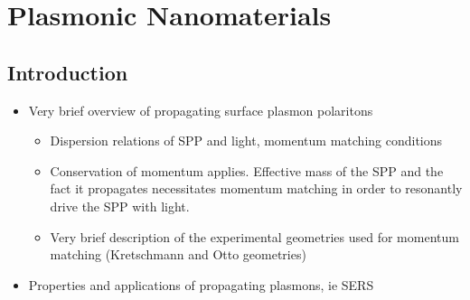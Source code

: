 \chapter{Plasmonic Nanomaterials}\label{sec:background:Plasmonics}

\section{Introduction}
\begin{itemize}
    \item Very brief overview of propagating surface plasmon polaritons
    \begin{itemize}
        \item Dispersion relations of SPP and light, momentum matching conditions
        \item Conservation of momentum applies. Effective mass of the SPP and the fact it propagates necessitates momentum matching in order to resonantly drive the SPP with light.
        \item Very brief description of the experimental geometries used for momentum matching (Kretschmann and Otto geometries)
    \end{itemize}
    \item Properties and applications of propagating plasmons, ie SERS
\end{itemize}

